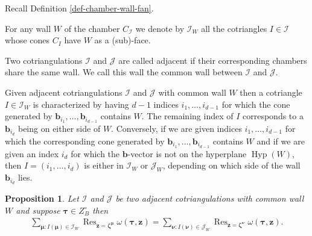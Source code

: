 \documentclass[11pt]{article}
\numberwithin{equation}{section}
\DeclareMathOperator*{\Res}{Res}
\numberwithin{equation}{section}
\newtheorem{Proposition}[Theorem]{Proposition}
 { \theoremstyle{definition}
\newtheorem{Definition}[Theorem]{Definition}
\newtheorem{Note}[Theorem]{Note}
\newtheorem{Example}[Theorem]{Example}
\newtheorem{Remark}[Theorem]{Remark} }
\begin{document}
Recall Definition \ref{def-chamber-wall-fan}.
\begin{Definition}
For any wall $W$ of the chamber $C_{\mathcal{I}}$ we denote by $\mathcal{I}_W$ all the cotriangles $I \in \mathcal{I}$ whose cones $C_I$ have $W$ as a (sub)-face.
\end{Definition}

\begin{Definition}
Two cotriangulations $\mathcal{I}$ and $\mathcal{J}$ are called adjacent if their corresponding chambers share the same wall. We call this wall the common wall between $\mathcal{I}$ and $\mathcal{J}$.
\end{Definition}

Given adjacent cotriangulations $\mathcal{I}$ and $\mathcal{J}$ with common wall $W$ then a cotriangle $I \in \mathcal{I}_W$ is characterized by having $d-1$ indices $i_1,\dots,i_{d-1}$ for which the cone generated by $\bm{b}_{i_1},\dots,\bm{b}_{i_{d-1}}$ contains $W$. The remaining index of $I$ corresponds to a $\bm{b}_{i_d}$ being on either side of $W$. Conversely, if we are given indices $i_1,\dots,i_{d-1}$
for which the corresponding cone generated by $\bm{b}_{i_1},\dots,\bm{b}_{i_{d-1}}$ contains
$W$ and if we are given an index $i_d$ for which the $\bm{b}$-vector is not on the hyperplane
$\operatorname{Hyp}(W)$, then $I = (i_1,\dots,i_{d})$ is either in $\mathcal{I}_W$ or
$\mathcal{J}_W$, depending on which side of the wall $\bm{b}_{i_d}$ lies.


\begin{Proposition}\label{lem-edge-res}
Let $\mathcal{I}$ and $\mathcal{J}$ be two adjacent cotriangulations with common wall $W$ and suppose $\bm\tau \in Z_B^\circ$ then
\begin{gather*}
\sum_{\bm\mu\colon I(\bm{\mu})\in\mathcal{I}_W}\Res_{\bm{z}=\bm\zeta^{\bm\mu}}\omega(\bm{\tau},\bm{z})
=\sum_{\bm\nu\colon I(\bm{\nu})\in\mathcal{J}_W}\Res_{\bm{z}=\bm\zeta^{\bm\nu}}\omega(\bm{\tau},\bm{z}).
\end{gather*}
\end{Proposition}
\end{document}
